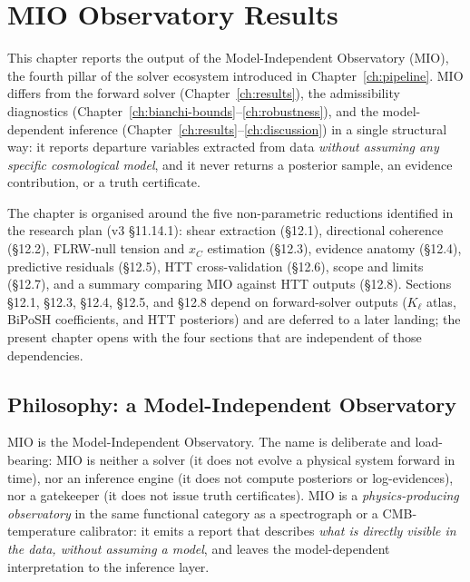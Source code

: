 
\chapter{MIO Observatory Results}
\label{ch:mio-observatory}

This chapter reports the output of the Model-Independent
Observatory (MIO), the fourth pillar of the solver ecosystem
introduced in Chapter~\ref{ch:pipeline}.  MIO differs from the
forward solver (Chapter~\ref{ch:results}), the admissibility
diagnostics
(Chapter~\ref{ch:bianchi-bounds}--\ref{ch:robustness}), and the
model-dependent inference
(Chapter~\ref{ch:results}--\ref{ch:discussion}) in a single
structural way: it reports departure variables extracted from
data \emph{without assuming any specific cosmological model},
and it never returns a posterior sample, an evidence
contribution, or a truth certificate.

The chapter is organised around the five non-parametric
reductions identified in the research plan (v3 §11.14.1): shear
extraction (§12.1), directional coherence (§12.2), FLRW-null
tension and $x_C$ estimation (§12.3), evidence anatomy (§12.4),
predictive residuals (§12.5), HTT cross-validation (§12.6),
scope and limits (§12.7), and a summary comparing MIO against
HTT outputs (§12.8).  Sections §12.1, §12.3, §12.4, §12.5, and
§12.8 depend on forward-solver outputs ($K_\ell$ atlas, BiPoSH
coefficients, and HTT posteriors) and are deferred to a later
landing; the present chapter opens with the four sections that
are independent of those dependencies.

\section{Philosophy: a Model-Independent Observatory}
\label{sec:mio-philosophy}

MIO is the Model-Independent Observatory.  The name is
deliberate and load-bearing: MIO is neither a solver (it does
not evolve a physical system forward in time), nor an
inference engine (it does not compute posteriors or
log-evidences), nor a gatekeeper (it does not issue truth
certificates).  MIO is a \emph{physics-producing observatory}
in the same functional category as a spectrograph or a
CMB-temperature calibrator: it emits a report that describes
\emph{what is directly visible in the data, without assuming a
model}, and leaves the model-dependent interpretation to the
inference layer.

